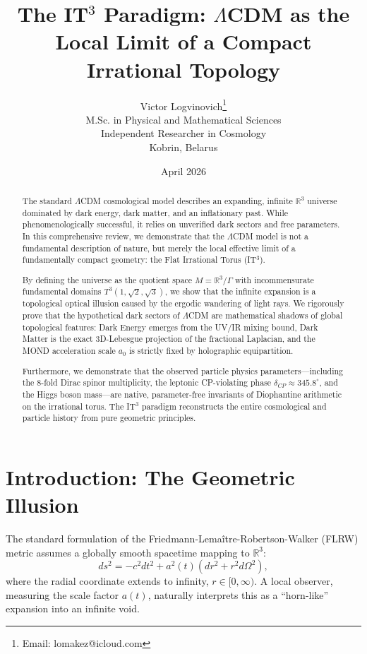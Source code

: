\documentclass[12pt, a4paper]{article}
\title{\textbf{The IT$^3$ Paradigm: $\Lambda$CDM as the Local Limit of a Compact Irrational Topology}}
\author{Victor Logvinovich\thanks{Email: lomakez@icloud.com}\\ 
M.Sc. in Physical and Mathematical Sciences\\
Independent Researcher in Cosmology\\
Kobrin, Belarus}
\date{April 2026}
\begin{document}
\maketitle

\begin{abstract}
The standard $\Lambda$CDM cosmological model describes an expanding, infinite $\mathbb{R}^3$ universe dominated by dark energy, dark matter, and an inflationary past. While phenomenologically successful, it relies on unverified dark sectors and free parameters. In this comprehensive review, we demonstrate that the $\Lambda$CDM model is not a fundamental description of nature, but merely the local effective limit of a fundamentally compact geometry: the Flat Irrational Torus (IT$^3$).

By defining the universe as the quotient space $M = \mathbb{R}^3 / \Gamma$ with incommensurate fundamental domains $T^3(1,\sqrt{2},\sqrt{3})$, we show that the infinite expansion is a topological optical illusion caused by the ergodic wandering of light rays. We rigorously prove that the hypothetical dark sectors of $\Lambda$CDM are mathematical shadows of global topological features: Dark Energy emerges from the UV/IR mixing bound, Dark Matter is the exact 3D-Lebesgue projection of the fractional Laplacian, and the MOND acceleration scale $a_0$ is strictly fixed by holographic equipartition. 

Furthermore, we demonstrate that the observed particle physics parameters---including the 8-fold Dirac spinor multiplicity, the leptonic CP-violating phase $\delta_{CP} \approx 345.8^\circ$, and the Higgs boson mass---are native, parameter-free invariants of Diophantine arithmetic on the irrational torus. The IT$^3$ paradigm reconstructs the entire cosmological and particle history from pure geometric principles.
\end{abstract}

\section{Introduction: The Geometric Illusion}

The standard formulation of the Friedmann-Lemaître-Robertson-Walker (FLRW) metric assumes a globally smooth spacetime mapping to $\mathbb{R}^3$:
\begin{equation}
ds^2 = -c^2 dt^2 + a^2(t)(dr^2 + r^2 d\Omega^2),
\end{equation}
where the radial coordinate extends to infinity, $r \in [0, \infty)$. A local observer, measuring the scale factor $a(t)$, naturally interprets this as a ``horn-like'' expansion into an infinite void.
\end{document}
